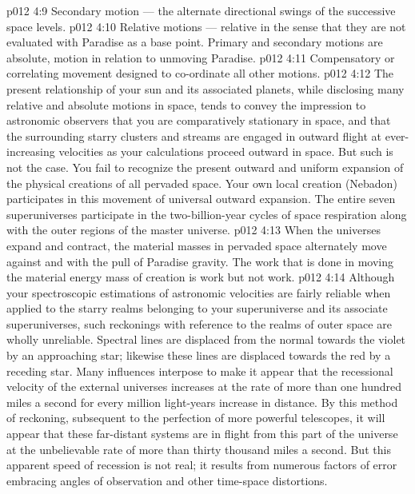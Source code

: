 \vs p012 4:9 \bibnobreakspace Secondary motion --- the alternate directional swings of the successive space levels.
\vs p012 4:10 \bibnobreakspace Relative motions --- relative in the sense that they are not evaluated with Paradise as a base point. Primary and secondary motions are absolute, motion in relation to unmoving Paradise.
\vs p012 4:11 \bibnobreakspace Compensatory or correlating movement designed to co\hyp{}ordinate all other motions.
\vs p012 4:12 \pc The present relationship of your sun and its associated planets, while disclosing many relative and absolute motions in space, tends to convey the impression to astronomic observers that you are comparatively stationary in space, and that the surrounding starry clusters and streams are engaged in outward flight at ever\hyp{}increasing velocities as your calculations proceed outward in space. But such is not the case. You fail to recognize the present outward and uniform expansion of the physical creations of all pervaded space. Your own local creation (Nebadon) participates in this movement of universal outward expansion. The entire seven superuniverses participate in the two\hyp{}billion\hyp{}year cycles of space respiration along with the outer regions of the master universe.
\vs p012 4:13 When the universes expand and contract, the material masses in pervaded space alternately move against and with the pull of Paradise gravity. The work that is done in moving the material energy mass of creation is  work but not  work.
\vs p012 4:14 \pc Although your spectroscopic estimations of astronomic velocities are fairly reliable when applied to the starry realms belonging to your superuniverse and its associate superuniverses, such reckonings with reference to the realms of outer space are wholly unreliable. Spectral lines are displaced from the normal towards the violet by an approaching star; likewise these lines are displaced towards the red by a receding star. Many influences interpose to make it appear that the recessional velocity of the external universes increases at the rate of more than one hundred miles a second for every million light\hyp{}years increase in distance. By this method of reckoning, subsequent to the perfection of more powerful telescopes, it will appear that these far\hyp{}distant systems are in flight from this part of the universe at the unbelievable rate of more than thirty thousand miles a second. But this apparent speed of recession is not real; it results from numerous factors of error embracing angles of observation and other time\hyp{}space distortions.
